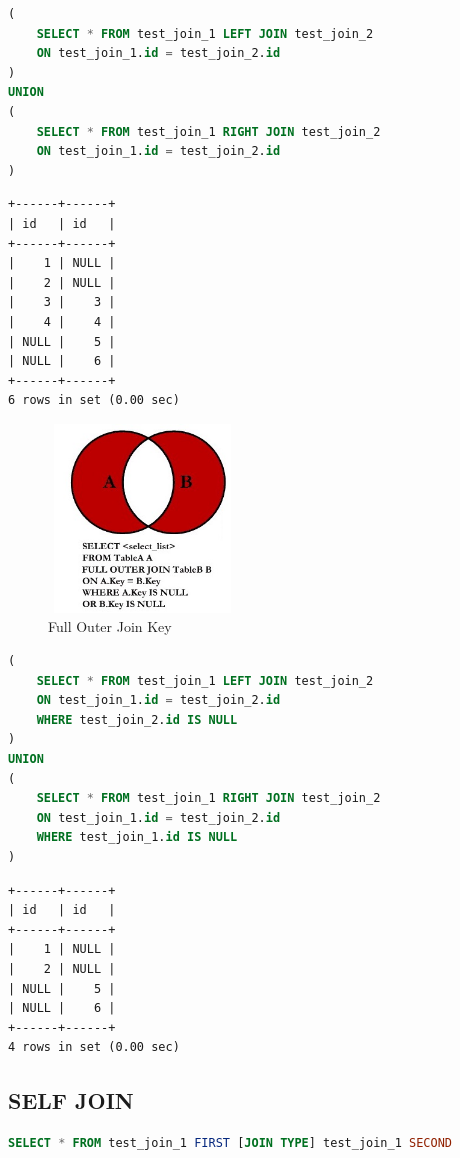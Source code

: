 \documentclass[12pt,a4paper]{article}
\begin{document}
\begin{lstlisting}[language=SQL]
(
	SELECT * FROM test_join_1 LEFT JOIN test_join_2 
	ON test_join_1.id = test_join_2.id
)
UNION
(
	SELECT * FROM test_join_1 RIGHT JOIN test_join_2 
	ON test_join_1.id = test_join_2.id
)
\end{lstlisting}

\begin{lstlisting}[basicstyle = \tiny\ttfamily, columns = fixed]
+------+------+
| id   | id   |
+------+------+
|    1 | NULL |
|    2 | NULL |
|    3 |    3 |
|    4 |    4 |
| NULL |    5 |
| NULL |    6 |
+------+------+
6 rows in set (0.00 sec)
\end{lstlisting}

\begin{figure}[!ht]
    \includegraphics[width=5cm,height=5cm]{images/Lab5/full_outer_join_key.jpg}
    \caption{Full Outer Join Key}
    \label{fig:FullOuterJoinKey}
\end{figure}

\begin{lstlisting}[language=SQL]
(
	SELECT * FROM test_join_1 LEFT JOIN test_join_2 
	ON test_join_1.id = test_join_2.id
    WHERE test_join_2.id IS NULL
)
UNION
(
	SELECT * FROM test_join_1 RIGHT JOIN test_join_2 
	ON test_join_1.id = test_join_2.id
    WHERE test_join_1.id IS NULL
)
\end{lstlisting}

\begin{lstlisting}[basicstyle = \tiny\ttfamily, columns = fixed]
+------+------+
| id   | id   |
+------+------+
|    1 | NULL |
|    2 | NULL |
| NULL |    5 |
| NULL |    6 |
+------+------+
4 rows in set (0.00 sec)
\end{lstlisting}

\subsection{SELF JOIN}
\begin{lstlisting}[language=SQL]
SELECT * FROM test_join_1 FIRST [JOIN TYPE] test_join_1 SECOND
\end{lstlisting}
\end{document}
